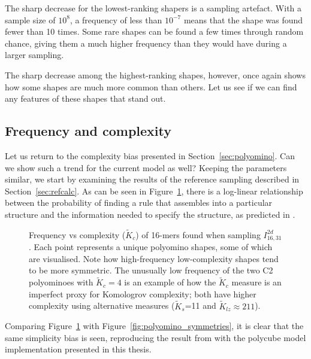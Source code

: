 The sharp decrease for the lowest-ranking shapers is a sampling artefact. With a sample size of \(10^8\), a frequency of less than \(10^{-7}\) means that the shape was found fewer than 10 times. Some rare shapes can be found a few times through random chance, giving them a much higher frequency than they would have during a larger sampling.

The sharp decrease among the highest-ranking shapes, however, once again shows how some shapes are much more common than others. Let us see if we can find any features of these shapes that stand out.

\subsection{Frequency and complexity}

Let us return to the complexity bias presented in Section~\ref{sec:polyomino}. Can we show such a trend for the current model as well? Keeping the parameters similar, we start by examining the results of the reference sampling described in Section~\ref{sec:refcalc}. As can be seen in Figure~\ref{fig:freq_vs_compl_refcalc}, there is a log-linear relationship between the probability of finding a rule that assembles into a particular structure and the information needed to specify the structure, as predicted in \cite{dingle2018input, dingle2020generic}.

\begin{figure}[h]
    \centering
    
    \caption{Frequency vs complexity (\(\widetilde{K}_c\)) of 16-mers found when sampling \(I_{16,31}^{2d}\). Each point represents a unique polyomino shapes, some of which are visualised. Note how high-frequency low-complexity shapes tend to be more symmetric. The unusually low frequency of the two C2 polyominoes with \(\widetilde{K}_c = 4\) is an example of how the \(\widetilde{K}_c\) measure is an imperfect proxy for Komologrov complexity; both have higher complexity using alternative measures (\(\widetilde{K}_s\)=11 and \(\widetilde{K}_{lz} \approx 211\)). }
    \label{fig:freq_vs_compl_refcalc}
\end{figure}

Comparing Figure~\ref{fig:freq_vs_compl_refcalc} with Figure~\ref{fig:polyomino_symmetries}, it is clear that the same simplicity bias is seen, reproducing the result from \cite{johnston2021} with the polycube model implementation presented in this thesis.

